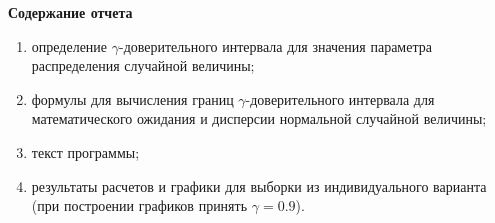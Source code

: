 \textbf{Содержание отчета}

\begin{enumerate}
    \item определение $\gamma$-доверительного интервала для
        значения параметра распределения случайной величины;
    \item формулы для вычисления границ $\gamma$-доверительного интервала
        для математического ожидания и дисперсии нормальной случайной
        величины;
    \item текст программы;
    \item результаты расчетов и графики для выборки из индивидуального варианта
        (при построении графиков принять $\gamma = 0.9$).
\end{enumerate}
